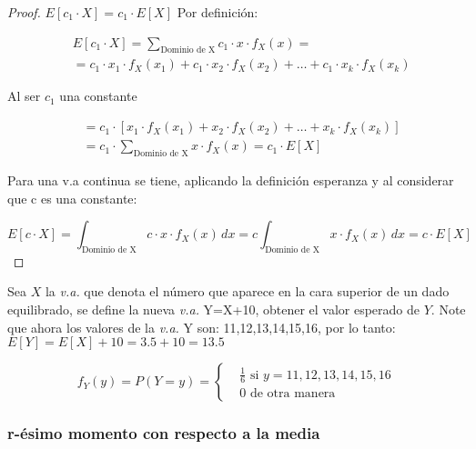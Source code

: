 \begin{proof}
    $E\left[ c_1\cdot X\right]=c_1\cdot E\left[ X\right]$
Por definición:

\begin{align*}
     & E\left[ c_1\cdot X\right]= \sum_{\text{Dominio de X}}c_1\cdot x\cdot f_X( x)=            \\
     & =c_1\cdot x_1\cdot f_X(x_1)+c_1\cdot x_2\cdot f_X(x_2)+\dots +c_1\cdot x_k\cdot f_X(x_k)
\end{align*}

Al ser $c_1$ una constante

\begin{align*}
     & =c_1\cdot \left[ x_1\cdot f_X(x_1)+x_2\cdot f_X(x_2)+\dots + x_k\cdot f_X(x_k)\right] \\
     & =c_1\cdot  \sum_{\text{Dominio de X}}x\cdot f_X( x)=c_1\cdot E\left[ X\right]
\end{align*}

Para una v.a continua se tiene, aplicando la
definición esperanza y al considerar que c es
una constante:

\begin{equation*}
    E\left[c\cdot X\right]=\int_{\text{Dominio de X}}c\cdot x\cdot f_X(x)\,dx=c \int_{\text{Dominio de X}}x\cdot f_X(x)\,dx=c\cdot E\left[X\right]
\end{equation*}
\end{proof}
\begin{example}
    Sea $X$ la \textit{v.a.} que denota el número que aparece en la cara superior de un dado equilibrado, se define la nueva \textit{v.a.} Y=X+10, obtener el valor esperado de $Y$.
    Note que ahora los valores de la \textit{v.a.} Y son: 11,12,13,14,15,16, por lo tanto:
    $E\left[ Y\right]=E\left[ X\right]+10=3.5+10=13.5$

    \begin{equation*}
        f_Y(y)=P(Y= y)=\begin{cases}
             & \frac{1}{6}\text{ si } y=11,12,13,14,15,16 \\
             & 0\text{ de otra manera}
        \end{cases}
    \end{equation*}
\end{example}

\subsubsection{r-ésimo momento con respecto a la media}

